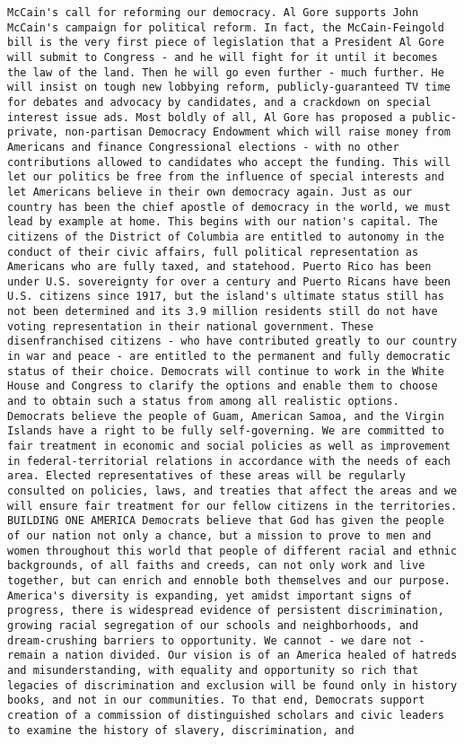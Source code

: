 \documentclass[
]{article}
\begin{document}
\begin{verbatim}
McCain's call for reforming our democracy. Al Gore supports John McCain's campaign for political reform. In fact, the McCain-Feingold bill is the very first piece of legislation that a President Al Gore will submit to Congress - and he will fight for it until it becomes the law of the land. Then he will go even further - much further. He will insist on tough new lobbying reform, publicly-guaranteed TV time for debates and advocacy by candidates, and a crackdown on special interest issue ads. Most boldly of all, Al Gore has proposed a public-private, non-partisan Democracy Endowment which will raise money from Americans and finance Congressional elections - with no other contributions allowed to candidates who accept the funding. This will let our politics be free from the influence of special interests and let Americans believe in their own democracy again. Just as our country has been the chief apostle of democracy in the world, we must lead by example at home. This begins with our nation's capital. The citizens of the District of Columbia are entitled to autonomy in the conduct of their civic affairs, full political representation as Americans who are fully taxed, and statehood. Puerto Rico has been under U.S. sovereignty for over a century and Puerto Ricans have been U.S. citizens since 1917, but the island's ultimate status still has not been determined and its 3.9 million residents still do not have voting representation in their national government. These disenfranchised citizens - who have contributed greatly to our country in war and peace - are entitled to the permanent and fully democratic status of their choice. Democrats will continue to work in the White House and Congress to clarify the options and enable them to choose and to obtain such a status from among all realistic options. Democrats believe the people of Guam, American Samoa, and the Virgin Islands have a right to be fully self-governing. We are committed to fair treatment in economic and social policies as well as improvement in federal-territorial relations in accordance with the needs of each area. Elected representatives of these areas will be regularly consulted on policies, laws, and treaties that affect the areas and we will ensure fair treatment for our fellow citizens in the territories. BUILDING ONE AMERICA Democrats believe that God has given the people of our nation not only a chance, but a mission to prove to men and women throughout this world that people of different racial and ethnic backgrounds, of all faiths and creeds, can not only work and live together, but can enrich and ennoble both themselves and our purpose. America's diversity is expanding, yet amidst important signs of progress, there is widespread evidence of persistent discrimination, growing racial segregation of our schools and neighborhoods, and dream-crushing barriers to opportunity. We cannot - we dare not - remain a nation divided. Our vision is of an America healed of hatreds and misunderstanding, with equality and opportunity so rich that legacies of discrimination and exclusion will be found only in history books, and not in our communities. To that end, Democrats support creation of a commission of distinguished scholars and civic leaders to examine the history of slavery, discrimination, and 
\end{verbatim}
\end{document}
